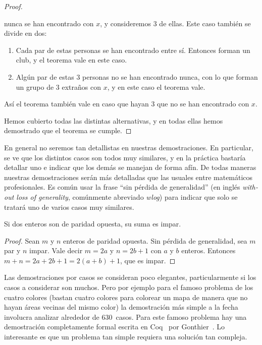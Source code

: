 \begin{proof}
\begin{enumerate}
      nunca se han encontrado con \(x\),
      y consideremos \(3\) de ellas.
      Este caso también se divide en dos:
      \begin{enumerate}
      \item
	Cada par de estas personas se han encontrado entre sí.
	Entonces forman un club,
	y el teorema vale en este caso.
      \item
	Algún par de estas \(3\) personas
	no se han encontrado nunca,
	con lo que forman un grupo de \(3\) extraños con \(x\),
	y en este caso el teorema vale.
      \end{enumerate}
      Así el teorema también vale
      en caso que hayan \(3\) que no se han encontrado con \(x\).
    \end{enumerate}
    Hemos cubierto todas las distintas alternativas,
    y en todas ellas hemos demostrado que el teorema se cumple.
  \end{proof}
  En general no seremos tan detallistas en nuestras demostraciones.
  En particular,
  se ve que los distintos casos son todos muy similares,
  y en la práctica bastaría detallar uno
  e indicar que los demás se manejan de forma afín.
  De todas maneras nuestras demostraciones
  serán más detalladas
  que las usuales entre matemáticos profesionales.
  Es común usar la frase ``sin pérdida de generalidad''%
  (en inglés
     \emph{\foreignlanguage{english}{without loss of generality}},
   comúnmente abreviado \emph{wlog})
  para indicar
  que solo se tratará uno de varios casos muy similares.
  \begin{proposition}
    Si dos enteros son de paridad opuesta,
    su suma es impar.
  \end{proposition}
  \begin{proof}
    Sean \(m\) y \(n\) enteros de paridad opuesta.
    Sin pérdida de generalidad,
    sea \(m\) par y \(n\) impar.
    Vale decir \(m = 2 a\) y \(n = 2 b + 1\)
    con \(a\) y \(b\) enteros.
    Entonces \(m + n = 2 a + 2 b + 1 = 2 (a + b) + 1\),
    que es impar.
  \end{proof}

  Las demostraciones por casos se consideran poco elegantes,
  particularmente si los casos a considerar son muchos.
  Pero por ejemplo para el famoso problema de los cuatro colores%
  (bastan cuatro colores para colorear un mapa
   de manera que no hayan áreas vecinas del mismo color)
  la demostración más simple a la fecha~%
    \cite{robertson97:_four_color_theor}
  involucra analizar alrededor de \(630\)~casos.
  Para este famoso problema
  hay una demostración completamente formal
  escrita en Coq~\cite{coq8.4:_coq_proof_assis}
  por Gonthier~\cite{gonthier08:_formal_proof}.
  Lo interesante es que un problema tan simple
  requiera una solución tan compleja.

